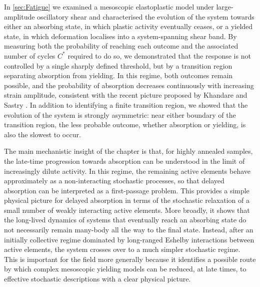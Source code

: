 \documentclass[asymmetricmargins]{library/duthesis}%
\begin{document}
In \cref{sec:Fatigue} we examined a mesoscopic elastoplastic model under large-amplitude oscillatory shear and characterised the evolution of the system towards either an absorbing state, in which plastic activity eventually ceases, or a yielded state, in which deformation localises into a system-spanning shear band. By measuring both the probability of reaching each outcome and the associated number of cycles $C^*$ required to do so, we demonstrated that the response is not controlled by a single sharply defined threshold, but by a transition region separating absorption from yielding. In this regime, both outcomes remain possible, and the probability of absorption decreases continuously with increasing strain amplitude, consistent with the recent picture proposed by Khandare and Sastry \cite{khandareElastoplasticModellingCyclic2026}. In addition to identifying a finite transition region, we showed that the evolution of the system is strongly asymmetric: near either boundary of the transition region, the less probable outcome, whether absorption or yielding, is also the slowest to occur.


The main mechanistic insight of the chapter is that, for highly annealed samples, the late-time progression towards absorption can be understood in the limit of increasingly dilute activity. In this regime, the remaining active elements behave approximately as a non-interacting stochastic processes, so that delayed absorption can be interpreted as a first-passage problem. This provides a simple physical picture for delayed absorption in terms of the stochastic relaxation of a small number of weakly interacting active elements. More broadly, it shows that the long-lived dynamics of systems that eventually reach an absorbing state do not necessarily remain many-body all the way to the final state. Instead, after an initially collective regime dominated by long-ranged Eshelby interactions between active elements, the system crosses over to a much simpler stochastic regime. This is important for the field more generally because it identifies a possible route by which complex mesoscopic yielding models can be reduced, at late times, to effective stochastic descriptions with a clear physical picture.
\end{document}
